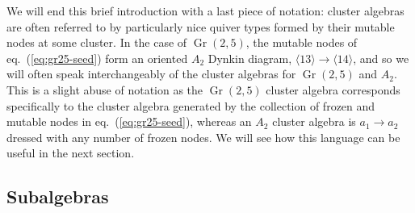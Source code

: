 \documentclass[11pt]{article}
\DeclareMathOperator{\Gr}{Gr}
\def\ket#1{\langle #1 \rangle}
\begin{document}
We will end this brief introduction with a last piece of notation: cluster algebras are often referred to by particularly nice quiver types formed by their mutable nodes at some cluster. In the case of $\Gr(2,5)$, the mutable nodes of eq.~(\ref{eq:gr25-seed}) form an oriented $A_2$ Dynkin diagram, $\ket{13}\to\ket{14}$, and so we will often speak interchangeably of the cluster algebras for $\Gr(2,5)$ and $A_2$. This is a slight abuse of notation as the $\Gr(2,5)$ cluster algebra corresponds specifically to the cluster algebra generated by the collection of frozen and mutable nodes in eq.~(\ref{eq:gr25-seed}), whereas an $A_2$ cluster algebra is $a_1 \to a_2$ dressed with any number of frozen nodes. We will see how this language can be useful in the next section.

\subsection{Subalgebras}
\end{document}
